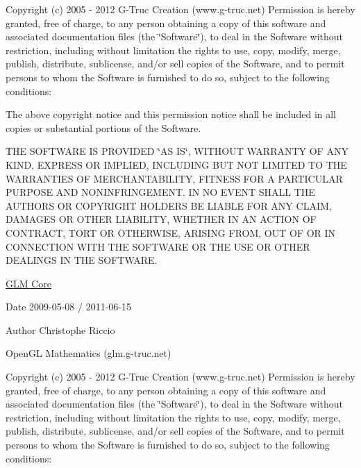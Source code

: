 \-Copyright (c) 2005 -\/ 2012 \-G-\/\-Truc \-Creation (www.\-g-\/truc.\-net) \-Permission is hereby granted, free of charge, to any person obtaining a copy of this software and associated documentation files (the \char`\"{}\-Software\char`\"{}), to deal in the \-Software without restriction, including without limitation the rights to use, copy, modify, merge, publish, distribute, sublicense, and/or sell copies of the \-Software, and to permit persons to whom the \-Software is furnished to do so, subject to the following conditions\-:

\-The above copyright notice and this permission notice shall be included in all copies or substantial portions of the \-Software.

\-T\-H\-E \-S\-O\-F\-T\-W\-A\-R\-E \-I\-S \-P\-R\-O\-V\-I\-D\-E\-D \char`\"{}\-A\-S I\-S\char`\"{}, \-W\-I\-T\-H\-O\-U\-T \-W\-A\-R\-R\-A\-N\-T\-Y \-O\-F \-A\-N\-Y \-K\-I\-N\-D, \-E\-X\-P\-R\-E\-S\-S \-O\-R \-I\-M\-P\-L\-I\-E\-D, \-I\-N\-C\-L\-U\-D\-I\-N\-G \-B\-U\-T \-N\-O\-T \-L\-I\-M\-I\-T\-E\-D \-T\-O \-T\-H\-E \-W\-A\-R\-R\-A\-N\-T\-I\-E\-S \-O\-F \-M\-E\-R\-C\-H\-A\-N\-T\-A\-B\-I\-L\-I\-T\-Y, \-F\-I\-T\-N\-E\-S\-S \-F\-O\-R \-A \-P\-A\-R\-T\-I\-C\-U\-L\-A\-R \-P\-U\-R\-P\-O\-S\-E \-A\-N\-D \-N\-O\-N\-I\-N\-F\-R\-I\-N\-G\-E\-M\-E\-N\-T. \-I\-N \-N\-O \-E\-V\-E\-N\-T \-S\-H\-A\-L\-L \-T\-H\-E \-A\-U\-T\-H\-O\-R\-S \-O\-R \-C\-O\-P\-Y\-R\-I\-G\-H\-T \-H\-O\-L\-D\-E\-R\-S \-B\-E \-L\-I\-A\-B\-L\-E \-F\-O\-R \-A\-N\-Y \-C\-L\-A\-I\-M, \-D\-A\-M\-A\-G\-E\-S \-O\-R \-O\-T\-H\-E\-R \-L\-I\-A\-B\-I\-L\-I\-T\-Y, \-W\-H\-E\-T\-H\-E\-R \-I\-N \-A\-N \-A\-C\-T\-I\-O\-N \-O\-F \-C\-O\-N\-T\-R\-A\-C\-T, \-T\-O\-R\-T \-O\-R \-O\-T\-H\-E\-R\-W\-I\-S\-E, \-A\-R\-I\-S\-I\-N\-G \-F\-R\-O\-M, \-O\-U\-T \-O\-F \-O\-R \-I\-N \-C\-O\-N\-N\-E\-C\-T\-I\-O\-N \-W\-I\-T\-H \-T\-H\-E \-S\-O\-F\-T\-W\-A\-R\-E \-O\-R \-T\-H\-E \-U\-S\-E \-O\-R \-O\-T\-H\-E\-R \-D\-E\-A\-L\-I\-N\-G\-S \-I\-N \-T\-H\-E \-S\-O\-F\-T\-W\-A\-R\-E.

\hyperlink{group__core}{\-G\-L\-M \-Core}

\begin{DoxyDate}{\-Date}
2009-\/05-\/08 / 2011-\/06-\/15 
\end{DoxyDate}
\begin{DoxyAuthor}{\-Author}
\-Christophe \-Riccio
\end{DoxyAuthor}
\-Open\-G\-L \-Mathematics (glm.\-g-\/truc.\-net)

\-Copyright (c) 2005 -\/ 2012 \-G-\/\-Truc \-Creation (www.\-g-\/truc.\-net) \-Permission is hereby granted, free of charge, to any person obtaining a copy of this software and associated documentation files (the \char`\"{}\-Software\char`\"{}), to deal in the \-Software without restriction, including without limitation the rights to use, copy, modify, merge, publish, distribute, sublicense, and/or sell copies of the \-Software, and to permit persons to whom the \-Software is furnished to do so, subject to the following conditions\-:

